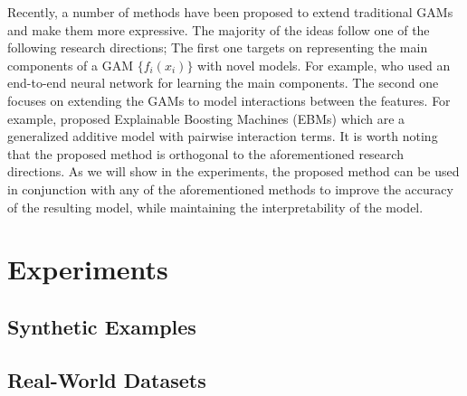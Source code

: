 \documentclass[12pt]{article}
\begin{document}
Recently, a number of methods have been proposed to extend traditional GAMs and make them more expressive.
The majority of the ideas follow one of the following research directions;
The first one targets on representing the main components of a GAM $\{ f_i(x_i) \}$ with novel models.
For example, \citet{agarwal2021neural} who used an end-to-end neural network for learning the main components.
The second one focuses on extending the GAMs to model interactions between the features.
For example, \citet{lou2013accurate} proposed Explainable Boosting Machines (EBMs) which are a generalized additive model with pairwise interaction terms.
It is worth noting that the proposed method is orthogonal to the aforementioned research directions.
As we will show in the experiments, the proposed method can be used in conjunction with any of the
aforementioned methods to improve the accuracy of the resulting model, while maintaining the interpretability of the model.

\section{Experiments}

\subsection{Synthetic Examples}

\subsection{Real-World Datasets}




\end{document}
